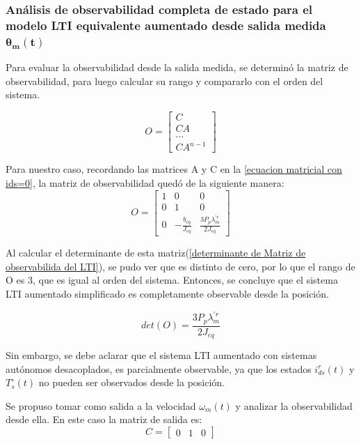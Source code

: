 \documentclass[a4paper, 10pt, onecolumn,journal]{ieeeconf}
\begin{document}
\subsubsection{\textbf{Análisis de observabilidad completa de estado para el modelo LTI equivalente aumentado desde salida medida $\mathbf{\theta_m(t)}$}}

Para evaluar la observabilidad desde la salida medida, se determinó la matriz de observabilidad, para luego calcular su rango y compararlo con el orden del sistema.

\begin{equation}
	O=
	\begin{bmatrix}
		C \\ 
		CA\\
		...\\
		CA^{n-1}  
	\end{bmatrix}
	\label{Matriz de observabilida generica}
\end{equation}

Para nuestro caso, recordando las matrices A y C en la \cref{ecuacion matricial con ids=0}, la matriz de observabilidad quedó de la siguiente manera:
\begin{equation}
	O=
	\begin{bmatrix}
		1 & 0 & 0 \\ 
		0 & 1 & 0\\
		 0 & -\frac{b_{eq}}{J_{eq}} & \frac{3 P_p \lambda^{'r}_m}{2 J_{eq}}  
	\end{bmatrix}
	\label{Matriz de observabilida del LTI}
\end{equation}

Al calcular el determinante de esta matriz(\cref{determinante de Matriz de observabilida del LTI}), se pudo ver que es distinto de cero, por lo que el rango de O es 3, que es igual al orden del sistema. Entonces, se concluye que el sistema LTI aumentado simplificado es completamente observable desde la posición.

\begin{equation}
	det(O)= \frac{3 P_p \lambda^{'r}_m}{2 J_{eq}}
	\label{determinante de Matriz de observabilida del LTI}
\end{equation}

Sin embargo, se debe aclarar que el sistema LTI aumentado con sistemas autónomos desacoplados, es parcialmente observable, ya que los estados ${i}^r_{ds}(t) $ y ${T}^\circ_s(t)$ no pueden ser observados desde la posición.

Se propuso tomar como salida a la velocidad ${\omega}_m(t)$ y analizar la observabilidad desde ella. En este caso la matriz de salida es:
\begin{equation}
	C=
	\begin{bmatrix}
		0 & 1 & 0  
	\end{bmatrix}
	\label{Matriz C con velocidad como salida}
\end{equation}
\end{document}

